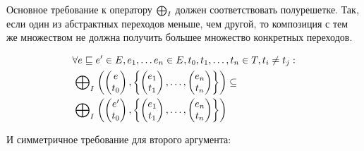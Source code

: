 Основное требование к оператору $\mathrel{\bigoplus}_I$ должен соответствовать полурешетке. Так, если один из абстрактных переходов меньше, чем другой, то композиция с тем же множеством не должна получить большее множество конкретных переходов. 


\begin{equation}
\label{cpa_tm_epp_req_1}
\begin{aligned}
& \forall e \sqsubseteq e' \in E, e_1, \dots e_n \in E, t_0,t_1,\dots,t_n \in T, t_i \neq t_j : \\
& \mathrel{\bigoplus}_I
\left(
\begin{pmatrix}
e \\
t_0 
\end{pmatrix} ,
\left\{
\begin{pmatrix}
e_1 \\
t_1 
\end{pmatrix} ,
\dots ,
\begin{pmatrix}
e_n \\
t_n 
\end{pmatrix}
\right\}
\right)
\subseteq \\
&\mathrel{\bigoplus}_I
\left(
\begin{pmatrix}
e' \\
t_0 
\end{pmatrix} ,
\left\{
\begin{pmatrix}
e_1 \\
t_1 
\end{pmatrix},
\dots ,
\begin{pmatrix}
e_n \\
t_n 
\end{pmatrix}
\right\}
\right)
\end{aligned}
\end{equation}

И симметричное требование для второго аргумента:

